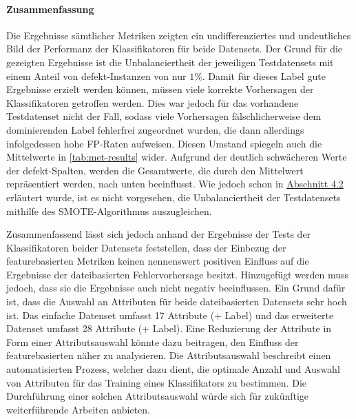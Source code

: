\paragraph{Zusammenfassung}
Die Ergebnisse sämtlicher Metriken zeigten ein undifferenziertes und undeutliches Bild der Performanz der Klassifikatoren für beide Datensets. Der Grund für die gezeigten Ergebnisse ist die Unbalanciertheit der jeweiligen Testdatensets mit einem Anteil von \glqq defekt\grqq -Instanzen von nur $1\%$. Damit für dieses Label gute Ergebnisse erzielt werden können, müssen viele korrekte Vorhersagen der Klassifikatoren getroffen werden. Dies war jedoch für das vorhandene Testdatenset nicht der Fall, sodass viele Vorhersagen fälschlicherweise dem dominierenden Label \glqq fehlerfrei\grqq{} zugeordnet wurden, die dann allerdings infolgedessen hohe FP-Raten aufweisen. Diesen Umstand spiegeln auch die Mittelwerte in \autoref{tab:met-results} wider. Aufgrund der deutlich schwächeren Werte der \glqq defekt\grqq -Spalten, werden die Gesamtwerte, die durch den Mittelwert repräsentiert werden, nach unten beeinflusst. Wie jedoch schon in \hyperref[smote]{Abschnitt 4.2} erläutert wurde, ist es nicht vorgesehen, die Unbalanciertheit der Testdatensets mithilfe des SMOTE-Algorithmus auszugleichen.

Zusammenfassend lässt sich jedoch anhand der Ergebnisse der Tests der Klassifikatoren beider Datensets feststellen, dass der Einbezug der featurebasierten Metriken keinen nennenswert positiven Einfluss auf die Ergebnisse der dateibasierten Fehlervorhersage besitzt. Hinzugefügt werden muss jedoch, dass sie die Ergebnisse auch nicht negativ beeinflussen. Ein Grund dafür ist, dass die Auswahl an Attributen für beide dateibasierten Datensets sehr hoch ist. Das \glqq einfache\grqq{} Datenset umfasst 17 Attribute (+ Label) und das erweiterte Datenset umfasst 28 Attribute (+ Label). Eine Reduzierung der Attribute in Form einer Attributsauswahl könnte dazu beitragen, den Einfluss der featurebasierten näher zu analysieren. Die Attributsauswahl beschreibt einen automatisierten Prozess, welcher dazu dient, die optimale Anzahl und Auswahl von Attributen für das Training eines Klassifikators zu bestimmen. Die Durchführung einer solchen Attributsauswahl würde sich für zukünftige weiterführende Arbeiten anbieten.


